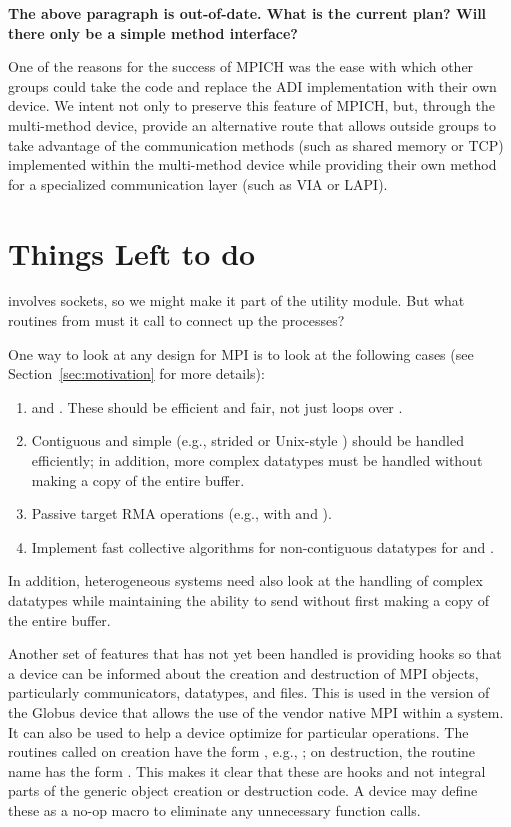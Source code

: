 \documentclass{article}
\begin{document}
\textbf{The above paragraph is out-of-date.  What is the current plan?
Will there only be a simple method interface?}

One of the reasons for the success of MPICH was the ease with which
other groups could take the code and replace the ADI implementation
with their own device.  We intent not only to preserve this feature of
MPICH, but, through the multi-method device, provide an alternative
route that allows outside groups to take advantage of the
communication methods (such as shared memory or TCP) implemented
within the multi-method device while providing their own method for a
specialized communication layer (such as VIA or LAPI).

\section{Things Left to do}

 involves sockets, so we might make it part of the
utility module.  But what routines from  must it call
to connect up the processes?

One way to look at any design for MPI is to look at the following
cases (see Section~\ref{sec:motivation} for more details):
\begin{enumerate}
\item {} and .  These should be
efficient and fair, not just loops over .
\item Contiguous and simple (e.g., strided or Unix-style ) should 
be handled efficiently; in addition, more complex datatypes must be handled
without making a copy of the entire buffer.  
\item Passive target RMA operations (e.g.,  with
 and ).
\item Implement fast collective algorithms for non-contiguous
datatypes for  and .
\end{enumerate}
In addition, heterogeneous systems need also look at the handling of
complex datatypes while maintaining the ability to send without first
making a copy of the entire buffer.

Another set of features that has not yet been handled is providing
hooks so that a device can be informed about the creation and
destruction of MPI objects, particularly communicators, datatypes, and
files.  This is used in the version of the Globus device that allows
the use of the vendor native MPI within a system.  It can also be used
to help a device optimize for particular operations.  
The routines called on creation have the form
, e.g.,
; on destruction, the routine name has
the form . This makes  
it clear that these are hooks and not integral parts of the generic
object creation or destruction code.  A device may define these as a
no-op macro to eliminate any unnecessary function calls.
\end{document}

